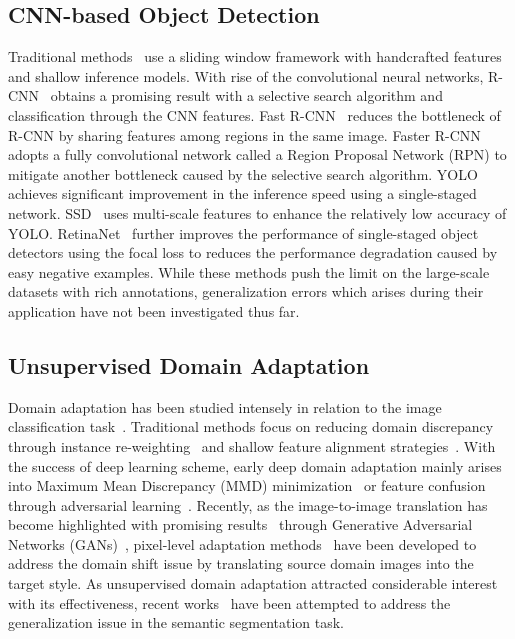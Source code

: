 \documentclass[10pt,twocolumn,letterpaper]{article}
\begin{document}
\subsection{CNN-based Object Detection}
Traditional methods~\cite{Traditional1,Traditional2} use a sliding window framework with handcrafted features and shallow inference models.
With rise of the convolutional neural networks, R-CNN~\cite{RCNN} obtains a promising result with a selective search algorithm and classification through the CNN features.
Fast R-CNN~\cite{FASTR-CNN} reduces the bottleneck of R-CNN by sharing features among regions in the same image.
Faster R-CNN~\cite{FasterR-CNN} adopts a fully convolutional network called a Region Proposal Network (RPN) to mitigate another bottleneck caused by the selective search algorithm. 
YOLO~\cite{YOLO} achieves significant improvement in the inference speed using a single-staged network.
SSD~\cite{SSD} uses multi-scale features to enhance the relatively low accuracy of YOLO.
RetinaNet~\cite{RetinaNet} further improves the performance of single-staged object detectors using the focal loss to reduces the performance degradation caused by easy negative examples.
While these methods push the limit on the large-scale datasets with rich annotations, generalization errors which arises during their application have not been investigated thus far.


\subsection{Unsupervised Domain Adaptation}

Domain adaptation has been studied intensely in relation to the image classification task~\cite{Reweight1, Reweight2}.
Traditional methods focus on reducing domain discrepancy through instance re-weighting~\cite{Reweight1, Reweight2, Reweight3} and shallow feature alignment strategies~\cite{ShallowAlign1, ShallowAlign2}.
With the success of deep learning scheme, early deep domain adaptation mainly arises into Maximum Mean Discrepancy (MMD) minimization~\cite{DeepAlign1_DAN, DeepAlign3_DCORAL, DeepAlign4_AutoDial} or feature confusion through adversarial learning~\cite{DeepAlign2_GRL}.
Recently, as the image-to-image translation has become highlighted with promising results~\cite{ImTrans1_pix2pix, ImTrans2_DiscoGAN, ImTrans3_CoGAN, CycleGAN} through Generative Adversarial Networks (GANs)~\cite{GAN}, pixel-level adaptation methods~\cite{pixel1_sbadagan, pix2_dubplex, pix3_pixlevel} have been developed to address the domain shift issue by translating source domain images into the target style.
As unsupervised domain adaptation attracted considerable interest with its effectiveness, recent works~\cite{seg1_CyCADA,seg2_curriculum,seg3_crossdomain,seg4_ROAD,seg5_FCNsWild, seg6_StructuredOutput, seg7_ConditionalGAN, seg8_FullyConv} have been attempted to address the generalization issue in the semantic segmentation task.
\end{document}
